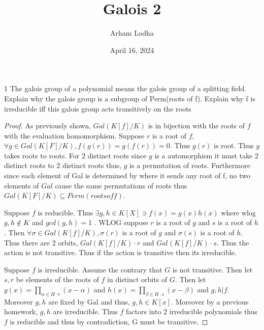 \documentclass{article}
\begin{document}
\title{Galois 2}
\author{Arham Lodha}%
\date{April 16, 2024}%
\maketitle

\begin{PROB}{1}\label{Problem 1.}
    The galois group of a polynomial means the galois group of a splitting field.  Explain why the galois group is a subgroup of Perm(roots of f). Explain why f is irreducible iff this galois group acts transitively on the roots
\end{PROB}
\begin{proof}
    As previously shown, $Gal(K[f] / K)$ is in bijection with the roots of $f$ with the evaluation homomorphism. Suppose $r$ is a root of $f$, $\forall g \in Gal(K[F] / K), f(g(r)) = g(f(r)) = 0$. Thus $g(r)$ is root. Thus $g$ takes roots to roots. For $2$ distinct roots since $g$ is a automorphism it must take 2 distinct roots to 2 distinct roots thus, $g$ is a permutation of roots. Furthermore since each element of Gal is determined by where it sends any root of f, no two elements of $Gal$ cause the same permutations of roots thus $Gal(K[F] / K) \subseteq Perm(roots of f)$. 
    
    Suppose $f$ is reducible. Thus $\exists g, h \in K[X] \ni f(x) = g(x) h(x)$ where wlog $g, h \not \in K $ and $gcd(g, h) = 1$ . WLOG suppose $r$ is a root of $g$ and $s$ is a root of $h$. Then $\forall \sigma \in Gal(K[f]/  K), \sigma(r) $ is a root of $g$ and $\sigma(s)$ is a root of $h$. Thus there are 2 orbits, $Gal(K[f]/K) \cdot r $ and $Gal(K[f] / K) \cdot s$. Thus the action is not transitive. Thus if the action is transitive then its irreducible. 

    Suppose $f$ is irreducible. Assume the contrary that $G$ is not transitive. Then let $s, r$ be elements of the roots of $f$ in distinct orbits of $G$. Then let $g(x) = \prod_{\alpha \in H \cdot r}(x - \alpha)$ and $h(x) = \prod_{\beta \in H \cdot s}(x - \beta)$ and $g, h | f$. Moreover $g, h$ are fixed by Gal and thus, $g, h \in K[x]$. Moreover by a previous homework, $g, h$ are irreducible. Thus $f$ factors into 2 irreducible polynomials thus $f$ is reducible and thus by contradiction, G must be transitive.             
\end{proof}

\bigskip
\end{document}
